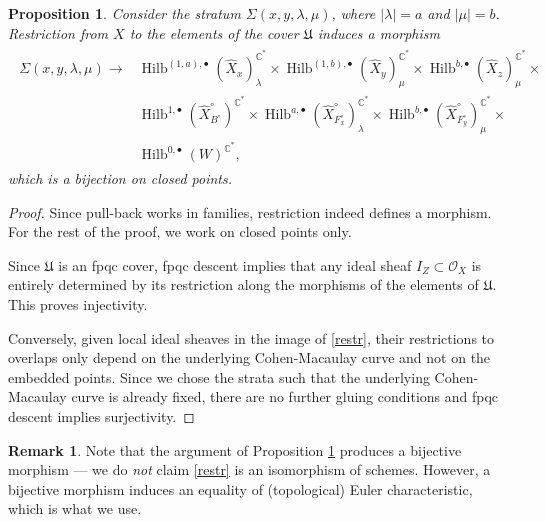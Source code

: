 \documentclass{amsart}
\newtheorem{proposition}[theorem]{Proposition}
\theoremstyle{definition}
\newtheorem{remark}[theorem]{Remark}
\newcommand{\CC} {\mathbb{C}}          %
\renewcommand{\O}{\mathcal{O}}
\newcommand{\Hilb}{\operatorname{Hilb}}
\newcommand{\Xhat}{\widehat{X}}
\begin{document}
\begin{proposition} \label{bij}
Consider the stratum $\Sigma(x,y,\lambda,\mu)$, where $|\lambda|=a$ and $|\mu|=b$. Restriction from $X$ to the elements of the cover $\mathfrak{U}$ induces a morphism
\begin{align}
\begin{split} \label{restr}
\Sigma(x,y,\lambda,\mu) \longrightarrow &\Hilb^{(1,a),\bullet}(\Xhat _x)_{\lambda}^{\CC^*} \times \Hilb^{(1,b),\bullet}(\Xhat _y)_{\mu}^{\CC^*} \times \Hilb^{b,\bullet}(\Xhat _z)_{\mu}^{\CC^*} \times \\
&\Hilb^{1,\bullet}(\Xhat ^{\circ}_{B^\circ})^{\CC^*} \times \Hilb^{a,\bullet}(\Xhat ^{\circ}_{F_{x}^{\circ}})_{\lambda}^{\CC^*} \times \Hilb^{b,\bullet}(\Xhat ^{\circ}_{F_{y}^{\circ}})_{\mu}^{\CC^*} \times \\
&\Hilb^{0,\bullet}(W)^{\CC^*},
\end{split}
\end{align}
which is a bijection on closed points.
\end{proposition}
\begin{proof}
Since pull-back works in families, restriction indeed defines a morphism. For the rest of the proof, we work on closed points only.

Since $\mathfrak{U}$ is an fpqc cover, fpqc descent implies that any ideal sheaf $I_Z \subset \O_X$ is entirely determined by its restriction along the morphisms of the elements of $\mathfrak{U}$. This proves injectivity.

Conversely, given local ideal sheaves in the image of \eqref{restr},
their restrictions to overlaps only depend on the underlying
Cohen-Macaulay curve and not on the embedded points. Since we chose
the strata such that the underlying Cohen-Macaulay curve is already
fixed, there are no further gluing conditions and fpqc descent implies
surjectivity.
\end{proof}
   
\begin{remark}
Note that the argument of Proposition \ref{bij} produces a bijective
morphism --- we do \emph{not} claim \eqref{restr} is an
isomorphism of schemes. However, a bijective morphism induces an
equality of (topological) Euler characteristic, which is what we use.
\end{remark}
\end{document}
